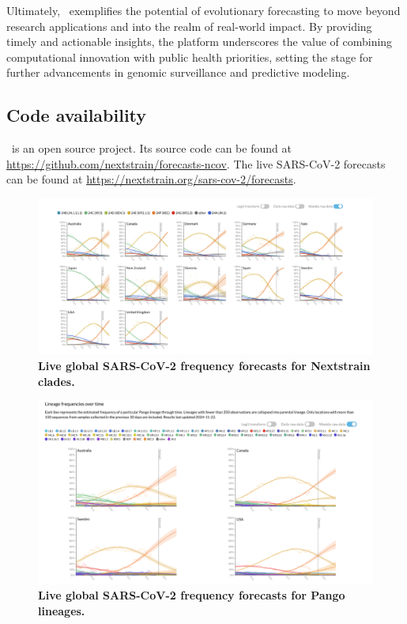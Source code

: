 Ultimately, \forecastsNcov\ exemplifies the potential of evolutionary forecasting to move beyond research applications and into the realm of real-world impact.
By providing timely and actionable insights, the platform underscores the value of combining computational innovation with public health priorities, setting the stage for further advancements in genomic surveillance and predictive modeling.

\subsection*{Code availability}

\forecastsNcov\ is an open source project.
Its source code can be found at \href{https://github.com/nextstrain/forecasts-ncov}{https://github.com/nextstrain/forecasts-ncov}.
The live SARS-CoV-2 forecasts can be found at \href{https://nextstrain.org/sars-cov-2/forecasts}{https://nextstrain.org/sars-cov-2/forecasts}.

\begin{figure}[h]
    \centering
    \includegraphics[width=1.0\linewidth]{./figures/clade_frequencies.png}
    \caption{
      \textbf{Live global SARS-CoV-2 frequency forecasts for Nextstrain clades.}
    }
    \label{fig:fn_clade_frequencies}
\end{figure}


\begin{figure}[h]
    \centering
    \includegraphics[width=1.0\linewidth]{./figures/lineage_frequencies.png}
    \caption{
      \textbf{Live global SARS-CoV-2 frequency forecasts for Pango lineages.}
    }
    \label{fig:fn_lineage_frequencies}
\end{figure}


